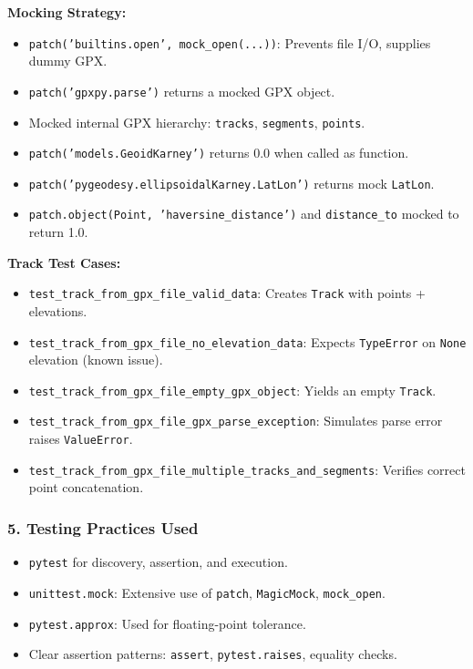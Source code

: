 \documentclass[12pt]{article}
\begin{document}
\textbf{Mocking Strategy:}
\begin{itemize}
  \item \texttt{patch('builtins.open', mock\_open(...))}: Prevents file I/O, supplies dummy GPX.
  \item \texttt{patch('gpxpy.parse')} returns a mocked GPX object.
  \item Mocked internal GPX hierarchy: \texttt{tracks}, \texttt{segments}, \texttt{points}.
  \item \texttt{patch('models.GeoidKarney')} returns 0.0 when called as function.
  \item \texttt{patch('pygeodesy.ellipsoidalKarney.LatLon')} returns mock \texttt{LatLon}.
  \item \texttt{patch.object(Point, 'haversine\_distance')} and \texttt{distance\_to} mocked to return 1.0.
\end{itemize}

\textbf{Track Test Cases:}
\begin{itemize}
  \item \texttt{test\_track\_from\_gpx\_file\_valid\_data}: Creates \texttt{Track} with points + elevations.
  \item \texttt{test\_track\_from\_gpx\_file\_no\_elevation\_data}: Expects \texttt{TypeError} on \texttt{None} elevation (known issue).
  \item \texttt{test\_track\_from\_gpx\_file\_empty\_gpx\_object}: Yields an empty \texttt{Track}.
  \item \texttt{test\_track\_from\_gpx\_file\_gpx\_parse\_exception}: Simulates parse error \textrightarrow{} raises \texttt{ValueError}.
  \item \texttt{test\_track\_from\_gpx\_file\_multiple\_tracks\_and\_segments}: Verifies correct point concatenation.
\end{itemize}

\subsubsection*{5. Testing Practices Used}
\begin{itemize}
  \item \texttt{pytest} for discovery, assertion, and execution.
  \item \texttt{unittest.mock}: Extensive use of \texttt{patch}, \texttt{MagicMock}, \texttt{mock\_open}.
  \item \texttt{pytest.approx}: Used for floating-point tolerance.
  \item Clear assertion patterns: \texttt{assert}, \texttt{pytest.raises}, equality checks.
\end{itemize}
\end{document}
